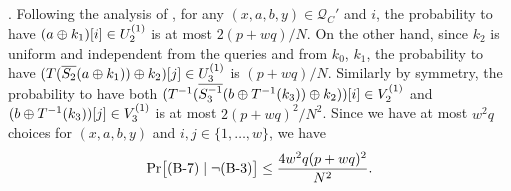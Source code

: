 %
%
%
%
%
%
%
%




\noindent \textsc{\bseven}. Following the analysis of \bsix, for any $(x,a,b,y)\in\mathcal{Q}_C'$ and $i$, the probability to have $(a\oplus k_1)[i]\in U_{2}^{(1)}$ is at most $2(p+wq)/N$. On the other hand, since $k_{2}$ is uniform and independent from the queries and from $k_{0}$, $k_{1}$, the probability to have $(T(\overline{S_2}(a \oplus k_1))\oplus k_2)[j]\in U_{3}^{(1)}$ is $(p+wq)/N$. Similarly by symmetry, the probability to have both $(T^{-1}(\overline{S_3^{-1}}(b\oplus T^{-1}(k_3))\oplus k_2))[i]\in V_2^{(1)}$ and $(b\oplus T^{-1}(k_3))[j]\in V_{3}^{(1)}$ is at most $2(p+wq)^2/N^2$. Since we have at most $w^2q$ choices for $(x,a,b,y)$ and $i, j \in\{1, \ldots, w\}$, we have
%
%
$$
{\Pr}\big[\text{(B-7)}\mid\neg\text{(B-3)}\big] \leq \frac{4w^{2} q (p+wq)^2}{N^2}.
$$
%




